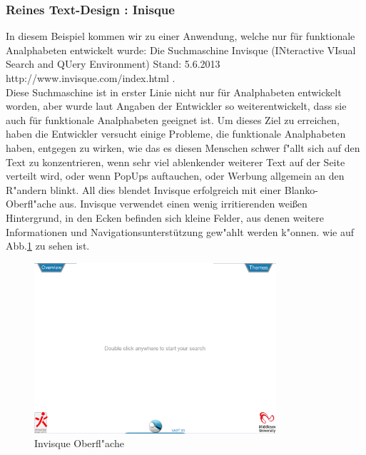 \newpage
\subsubsection{Reines Text-Design : Inisque}
In diesem Beispiel kommen wir zu einer Anwendung, welche nur für funktionale Analphabeten entwickelt wurde: Die Suchmaschine Invisque (INteractive VIsual Search and QUery Environment)
						{Stand: 5.6.2013}
						{http://www.invisque.com/index.html}{}
.\\ Diese Suchmaschine ist in erster Linie nicht nur für Analphabeten entwickelt worden, aber wurde laut Angaben der Entwickler so weiterentwickelt, dass sie auch für funktionale Analphabeten geeignet ist. Um dieses Ziel zu erreichen, haben die Entwickler versucht einige Probleme, die funktionale Analphabeten haben, entgegen zu wirken, wie das es diesen Menschen schwer f"allt sich auf den Text zu konzentrieren, wenn sehr viel ablenkender weiterer Text auf der Seite verteilt wird, oder wenn PopUps auftauchen, oder Werbung allgemein an den R"andern blinkt. All dies blendet Invisque erfolgreich mit einer Blanko-Oberfl"ache aus. Invisque verwendet einen wenig irritierenden weißen Hintergrund, in den Ecken befinden sich kleine Felder, aus denen weitere Informationen und Navigationsunterstützung gew"ahlt werden k"onnen. wie auf Abb.\ref{fig:Invisque} zu sehen ist.

\begin{figure}[h]
	\centering
		\includegraphics[width=0.80\textwidth]{Daten/Inisque.PNG}
	\caption{Invisque Oberfl"ache}
	\label{fig:Invisque}
\end{figure}

